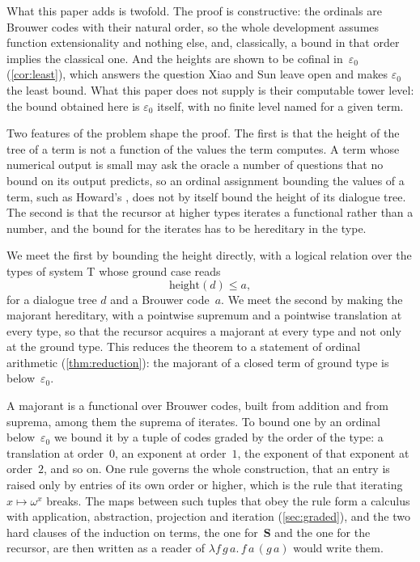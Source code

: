 \documentclass[11pt]{amsart}
\newcommand{\height}{\mathrm{height}}
\newcommand{\Sc}{\mathbf{S}}
\newcommand{\eps}{\varepsilon_{0}}
\theoremstyle{plain}
\theoremstyle{definition}
\begin{document}
What this paper adds is twofold. The proof is constructive: the
ordinals are Brouwer codes with their natural order, so the whole
development assumes function extensionality and nothing else, and,
classically, a bound in that order implies the classical one. And the
heights are
shown to be cofinal in~$\eps$ (\cref{cor:least}), which answers the
question Xiao and Sun leave open and makes $\eps$ the least bound.
What this paper does not supply is their computable tower level: the
bound obtained here is $\eps$ itself, with no finite level named for a
given term.

Two features of the problem shape the proof. The first is that the
height of the tree of a term is not a function of the values the term
computes. A term whose numerical output is small may ask the oracle a
number of questions that no bound on its output predicts, so an
ordinal assignment bounding the values of a term, such as Howard's
\cite{Howard1970}, does not by itself bound the height of its dialogue
tree. The second is that the recursor at higher types iterates a
functional rather than a number, and the bound for the iterates has to
be hereditary in the type.

We meet the first by bounding the height directly, with a logical
relation over the types of system T whose ground case reads
\[
  \height(d) \le a ,
\]
for a dialogue tree $d$ and a Brouwer code~$a$. We meet the second by
making the majorant hereditary, with a pointwise supremum and a
pointwise translation at every type, so that the recursor acquires a
majorant at every type and not only at the ground type. This reduces
the theorem to a statement of ordinal arithmetic
(\cref{thm:reduction}): the majorant of a closed term of ground type
is below~$\eps$.

A majorant is a functional over Brouwer codes, built from addition
and from suprema, among them the suprema of iterates. To bound one by
an ordinal below~$\eps$ we bound it by a tuple of codes graded by the
order of the type: a
translation at order~$0$, an exponent at order~$1$, the exponent of
that exponent at order~$2$, and so on. One rule governs the whole
construction, that an entry is raised only by entries of its own order
or higher, which is the rule that iterating $x\mapsto\omega^{x}$
breaks. The maps between such tuples that obey the rule form a
calculus with application, abstraction, projection and iteration
(\cref{sec:graded}), and the two hard clauses of the induction on
terms, the one for~$\Sc$ and the one for the recursor, are then
written as a reader of $\lambda f\,g\,a.\,f\,a\,(g\,a)$ would write
them.
\end{document}
